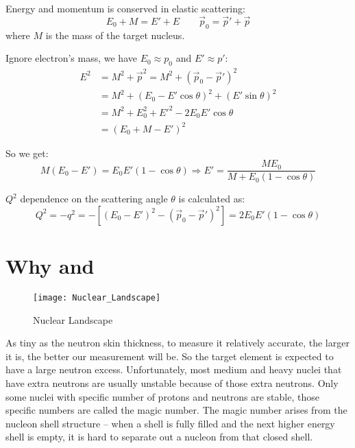 Energy and momentum is conserved in elastic scattering:
$$ E_0 + M = E' + E \qquad \vec{p}_0 = \vec{p}' + \vec{p} $$
where $M$ is the mass of the target nucleus.

Ignore electron's mass, we have $E_0 \approx p_0$ and $E' \approx p'$:
\begin{equation}
    \begin{aligned}
	E^2 &= M^2 + \vec{p}^2 = M^2 + (\vec{p}_0 - \vec{p}')^2  \\
	    &= M^2 + (E_0 - E'\cos\theta)^2 + (E'\sin\theta)^2	\\
	    &= M^2 + E_0^2 + E'^2 - 2E_0E'\cos\theta	\\
	    &= (E_0 + M - E')^2
    \end{aligned}
\end{equation}

So we get:
\begin{equation}
    M(E_0 - E') = E_0E'(1-\cos\theta)   \Longrightarrow
    E' = \frac{ME_0}{M + E_0(1-\cos\theta)}
\label{eq:scattered_energy}
\end{equation}

$Q^2$ dependence on the scattering angle $\theta$ is calculated as:
\begin{equation}
    Q^2 = -q^2 = -[(E_0 - E')^2 - (\vec{p}_0 - \vec{p}')^2] = 2E_0E'(1-\cos\theta)
    \label{eq:Q2}
\end{equation}

\section{Why \Pb and \Ca}
\begin{figure}[H]
    \centering
    \texttt{[image: Nuclear\_Landscape]}
    \caption{Nuclear Landscape}
    \label{fig:nuclear_landscape}
\end{figure}
As tiny as the neutron skin thickness, to measure it relatively accurate, the
larger it is, the better our measurement will be. So the target element is expected to
have a large neutron excess. Unfortunately, most medium and heavy nuclei that
have extra neutrons are usually unstable because of those extra neutrons. Only
some nuclei with specific number of protons and neutrons are stable, those specific
numbers are called the magic number. The magic number arises from the nucleon 
shell structure -- when a shell is fully filled and the next higher energy shell 
is empty, it is hard to separate out a nucleon from that closed shell.

